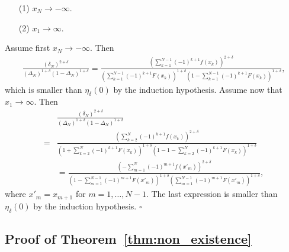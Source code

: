 \documentclass[letterpaper, 11pt]{IEEEtran}      %
\newcommand*{\QEDA}{\hfill\ensuremath{\square}}
\begin{document}
\begin{itemize}
\item[(1)]  $x_N \to -\infty$.
\item[(2)] $x_1 \to \infty$.
\end{itemize}
Assume first $x_N \rightarrow -\infty$. Then 
\begin{align*}
\frac{ \left( \delta_N \right)^{2+\delta}} 
{\left(\Delta_N \right)^{1+\delta}\left(1- \Delta_N \right)^{1+\delta}  }
 = \frac{ \left(  \sum_{k=1}^{N-1} (-1)^{k+1}f(x_k) \right)^{2+\delta}} 
{\left( \sum_{k=1}^{N-1} (-1)^{k+1} F(x_k) \right)^{1+\delta}\left(1- \sum_{k=1}^{N-1} (-1)^{k+1} F(x_k)  \right)^{1+\delta} } ,
\end{align*}
which is smaller than $\eta_\delta(0)$ by the induction hypothesis. Assume now that $x_1 \rightarrow \infty$. Then 
\begin{align*}
& \frac{ \left( \delta_N \right)^{2+\delta}} 
{\left(\Delta_N \right)^{1+\delta}\left(1- \Delta_N \right)^{1+\delta}  } \\
=
& \frac{ \left(  \sum_{k=2}^{N} (-1)^{k+1}f(x_k) \right)^{2+\delta}} 
{\left( 1 + \sum_{k=2}^{N} (-1)^{k+1} F(x_k) \right)^{1+\delta}\left(1- 1 - \sum_{k=2}^{N} (-1)^{k+1} F(x_k)  \right)^{1+\delta} }  \\
& = \frac{ \left(  -\sum_{m=1}^{N} (-1)^{m+1}f(x'_m) \right)^{2+\delta}} 
{\left( 1 - \sum_{m=1}^{N-1} (-1)^{m+1} F(x'_{m}) \right)^{1+\delta}\left( \sum_{m=1}^{N-1} (-1)^{m+1} F(x'_{m})  \right)^{1+\delta} },
\end{align*}
where $x'_{m} = x_{m+1}$ for $m=1,\ldots, N-1$. The last expression is smaller than $\eta_{\delta}(0)$ by the induction hypothesis.  \QEDA \\


\subsection*{Proof of Theorem~\ref{thm:non_existence}}
\end{document}
